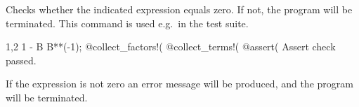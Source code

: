 
Checks whether the indicated expression equals zero. If not, the
program will be terminated. This command is used e.g.~in the test
suite.
\begin{screen}{1,2}
1 - B B**(-1);
@collect_factors!(%
@collect_terms!(%
@assert(%
Assert check passed.
\end{screen}
If the expression is not zero an error message will be produced, and
the program will be terminated.


